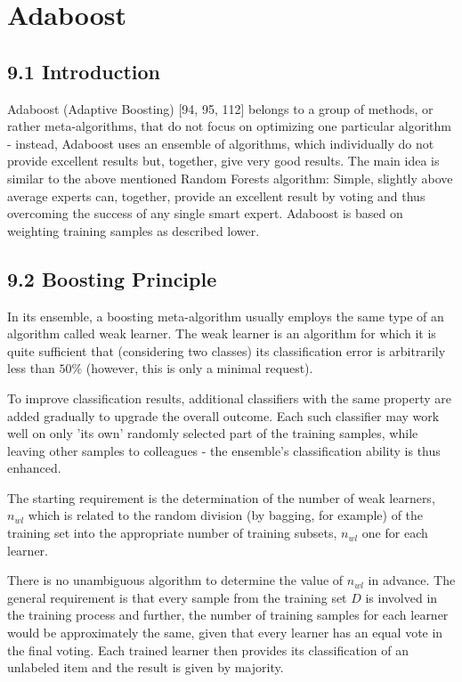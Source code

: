 \documentclass[10pt]{book}
\begin{document}
\section*{Adaboost}
\subsection*{9.1 Introduction}
Adaboost (Adaptive Boosting) [94, 95, 112] belongs to a group of methods, or rather meta-algorithms, that do not focus on optimizing one particular algorithm - instead, Adaboost uses an ensemble of algorithms, which individually do not provide excellent results but, together, give very good results. The main idea is similar to the above mentioned Random Forests algorithm: Simple, slightly above average experts can, together, provide an excellent result by voting and thus overcoming the success of any single smart expert. Adaboost is based on weighting training samples as described lower.

\subsection*{9.2 Boosting Principle}
In its ensemble, a boosting meta-algorithm usually employs the same type of an algorithm called weak learner. The weak learner is an algorithm for which it is quite sufficient that (considering two classes) its classification error is arbitrarily less than $50 \%$ (however, this is only a minimal request).

To improve classification results, additional classifiers with the same property are added gradually to upgrade the overall outcome. Each such classifier may work well on only 'its own' randomly selected part of the training samples, while leaving other samples to colleagues - the ensemble's classification ability is thus enhanced.

The starting requirement is the determination of the number of weak learners, $n_{w l}$ which is related to the random division (by bagging, for example) of the\\
training set into the appropriate number of training subsets, $n_{w l}$ one for each learner.

There is no unambiguous algorithm to determine the value of $n_{w l}$ in advance. The general requirement is that every sample from the training set $D$ is involved in the training process and further, the number of training samples for each learner would be approximately the same, given that every learner has an equal vote in the final voting. Each trained learner then provides its classification of an unlabeled item and the result is given by majority.
\end{document}
